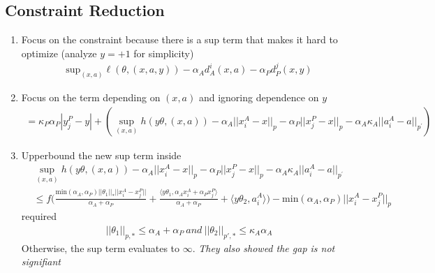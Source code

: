 \documentclass{article}
\begin{document}
    \subsection*{Constraint Reduction}
    \begin{enumerate}
        \item Focus on the constraint because there is a sup term that makes it hard to optimize (analyze $y=+1$ for simplicity)
        \begin{align*}
            \mathrm{sup}_{(x, a)} \ell(\theta,(x,a,y))-\alpha_{A}d_{A}^{i}(x,a)-\alpha_{P} d_{P}^{j}(x,y)
        \end{align*}
        \item Focus on the term depending on $(x, a)$ and ignoring dependence on $y$
        \begin{align*}
            = \kappa_{P}\alpha_{P} | y_{j}^{P}-y | + \left(\operatorname*{sup}_{(x, a)} h(y\theta,(x,a))-\alpha_{A}\vert\vert x_{i}^{A}-x\vert\vert_{p}-\alpha_{P}\vert\vert x_{j}^{P}-x\vert\vert_{p}-\alpha_{A} \kappa_A \vert\vert a_{i}^{A}-a\vert\vert_{p^{\prime}}\right)
        \end{align*}
        \item Upperbound the new sup term inside
        \begin{align*}
            &\operatorname*{sup}_{(x, a)} h(y\theta,(x,a))-\alpha_{A}\vert\vert x_{i}^{A}-x\vert\vert_{p}-\alpha_{P}\vert\vert x_{j}^{P}-x\vert\vert_{p}-\alpha_{A} \kappa_A \vert\vert a_{i}^{A}-a\vert\vert_{p^{\prime}}
            \\ &\le f\Biggl(\frac{\mathrm{min}(\alpha_{A},\alpha_P)||\theta_{1}||_* ||x_{i}^{A}-x_{j}^{P}||}{\alpha_{A}+\alpha_{P}}+\frac{\langle y\theta_{1},\alpha_{A}x_{i}^{A}+\alpha_P x_{j}^{P}\rangle}{\alpha_{A}+\alpha_{P}}+\langle y\theta_{2},a_{i}^{A}\rangle\Biggr) - \mathrm{min}(\alpha_A, \alpha_P) ||x_i^A - x_j^P ||_p
        \end{align*}
        required 
        \begin{align*}
            ||\theta_1||_{p, *} \le \alpha_A + \alpha_P \ and \ ||\theta_2||_{p', *} \le \kappa_A \alpha_A
        \end{align*}
        Otherwise, the sup term evaluates to $\infty$. \textit{They also showed the gap is not signifiant}


\end{enumerate}
\end{document}
